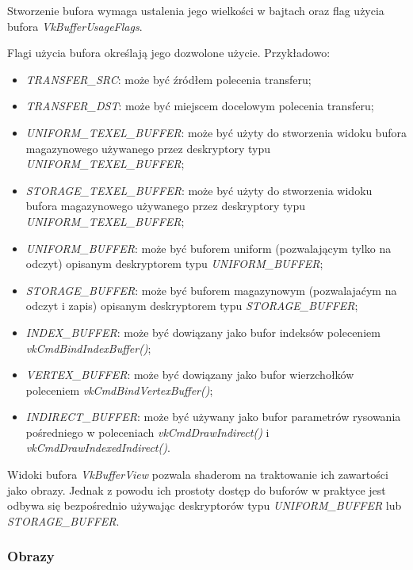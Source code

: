 Stworzenie bufora wymaga ustalenia jego wielkości w bajtach oraz flag użycia bufora \textit{VkBufferUsageFlags}.

Flagi użycia bufora określają jego dozwolone użycie.
Przykładowo:
\begin{itemize}
	\item \textit{TRANSFER\_SRC}: może być źródłem polecenia transferu;
	\item \textit{TRANSFER\_DST}: może być miejscem docelowym polecenia transferu;
	\item \textit{UNIFORM\_TEXEL\_BUFFER}: może być użyty do stworzenia widoku bufora magazynowego używanego przez deskryptory typu \textit{UNIFORM\_TEXEL\_BUFFER};
	\item \textit{STORAGE\_TEXEL\_BUFFER}: może być użyty do stworzenia widoku bufora magazynowego używanego przez deskryptory typu \textit{UNIFORM\_TEXEL\_BUFFER};
	\item \textit{UNIFORM\_BUFFER}: może być buforem uniform (pozwalającym tylko na odczyt) opisanym deskryptorem typu \textit{UNIFORM\_BUFFER};
	\item \textit{STORAGE\_BUFFER}: może być buforem magazynowym (pozwalajaćym na odczyt i zapis) opisanym deskryptorem typu \textit{STORAGE\_BUFFER};
	\item \textit{INDEX\_BUFFER}: może być dowiązany jako bufor indeksów poleceniem \textit{vkCmdBindIndexBuffer()};
	\item \textit{VERTEX\_BUFFER}: może być dowiązany jako bufor wierzchołków poleceniem \textit{vkCmdBindVertexBuffer()};
	\item \textit{INDIRECT\_BUFFER}: może być używany jako bufor parametrów rysowania pośredniego w poleceniach \textit{vkCmdDrawIndirect()} i \textit{vkCmdDrawIndexedIndirect()}.
\end{itemize}

Widoki bufora \textit{VkBufferView} pozwala shaderom na traktowanie ich zawartości jako obrazy.
Jednak z powodu ich prostoty dostęp do buforów w praktyce jest odbywa się bezpośrednio używając deskryptorów typu \textit{UNIFORM\_BUFFER} lub \textit{STORAGE\_BUFFER}.

\subsubsection{Obrazy}

